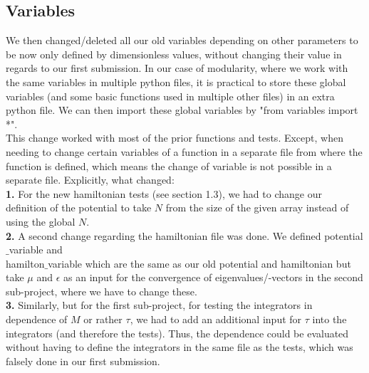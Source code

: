 \documentclass[11pt, letterpaper, onecolumn]{article}
\begin{document}
\subsection{Variables}
	We then changed/deleted all our old variables depending on other parameters to be now only defined by dimensionless values, without changing their value in regards to our first submission. In our case of modularity, where we work with the same variables in multiple python files, it is practical to store these global variables (and some basic functions used in multiple other files) in an extra python file. We can then import these global variables by "from variables import *". \\
	This change worked with most of the prior functions and tests. Except, when needing to change certain variables of a function in a separate file from where the function is defined, which means the change of variable is not possible in a separate file. Explicitly, what changed: \\
	\textbf{1.} For the new hamiltonian tests (see section 1.3), we had to change our definition of the potential to take $N$ from the size of the given array instead of using the global $N$.\\
	\textbf{2.} A second change regarding the hamiltonian file was done. We defined potential$\_$variable and \\hamilton$\_$variable which are the same as our old potential and hamiltonian but take $\mu$ and $\epsilon$ as an input for the convergence of eigenvalues/-vectors in the second sub-project, where we have to change these.\\
	\textbf{3.} Similarly, but for the first sub-project, for testing the integrators in dependence of $M$ or rather $\tau$, we had to add an additional input for $\tau$ into the integrators (and therefore the tests). Thus, the dependence could be evaluated without having to define the integrators in the same file as the tests, which was falsely done in our first submission.
	
	
\end{document}
